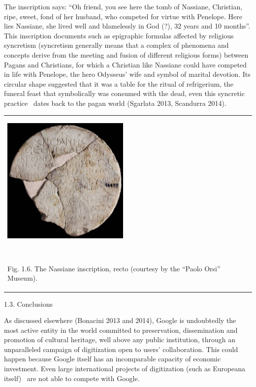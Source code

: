 \documentclass[amsthm,ebook]{saparticle}
\begin{document}
\bigskip

The inscription says: “Oh friend, you see here the tomb of Nassiane, Christian, ripe, sweet, fond of her husband, who
competed for virtue with Penelope. Here lies Nassiane, she lived well and blamelessly in God (?), 32 years and 10
months”. This inscription documents such as epigraphic formulas affected by religious syncretism (syncretism generally
means that a complex of phenomena and concepts derive from the meeting and fusion of different religious forms) between
Pagans and Christians, for which a Christian like Nassiane could have competed in life with Penelope, the hero
Odysseus’ wife and symbol of marital devotion. Its circular shape suggested that it was a table for the ritual of
refrigerium, the funeral feast that symbolically was consumed with the dead, even this syncretic practice \ dates back
to the pagan world (Sgarlata 2013, Scandurra 2014).


\bigskip

\begin{flushleft}
\tablefirsthead{}
\tablehead{}
\tabletail{}
\tablelasttail{}
\begin{supertabular}{m{10.681cm}}
{\centering  \includegraphics[width=6.205cm,height=6.174cm]{EAGLE2016BONACINIPilotprojectatPaoloOrsiMuseum-img006.jpg}
\par}

~

Fig. 1.6. The Nassiane inscription, recto (courtesy by the “Paolo Orsi” Museum). \\
\end{supertabular}
\end{flushleft}

\bigskip

1.3. Conclusions

As discussed elsewhere (Bonacini 2013 and 2014), Google is undoubtedly the most active entity in the world committed to
preservation, dissemination and promotion of cultural heritage, well above any public institution, through an
unparalleled campaign of digitization open to users’ collaboration. This could happen because Google itself has an
incomparable capacity of economic investment. Even large international projects of digitization (such as Europeana
itself) \ are not able to compete with Google.
\end{document}
